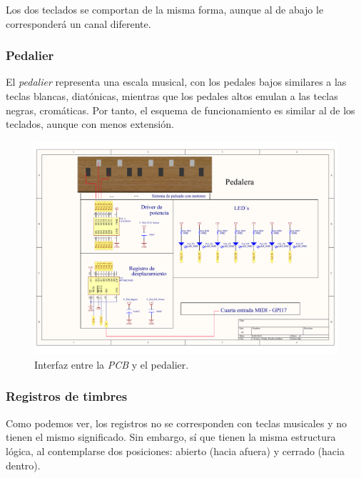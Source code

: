 \smallskip

Los dos teclados se comportan de la misma forma, aunque al de abajo le corresponderá un canal diferente.

\subsubsection{Pedalier}

El \textit{pedalier} representa una escala musical, con los pedales bajos similares a las teclas blancas, diatónicas, mientras que los pedales altos emulan a las teclas negras, cromáticas. Por tanto, el esquema de funcionamiento es similar al de los teclados, aunque con menos extensión.

\smallskip

\begin{figure}[H]
	\noindent \begin{centering}
		\includegraphics[width=\linewidth*2/3]{capitulo3/pcb_pedalier}
		\par\end{centering}
	\smallskip
	\caption{\label{fig:pcb_pedalier} Interfaz entre la \textit{PCB} y el pedalier.}
\end{figure} 

\smallskip

\subsubsection{Registros de timbres}

Como podemos ver, los registros no se corresponden con teclas musicales y no tienen el mismo significado. Sin embargo, sí que tienen la misma estructura lógica, al contemplarse dos posiciones: abierto (hacia afuera) y cerrado (hacia dentro).

